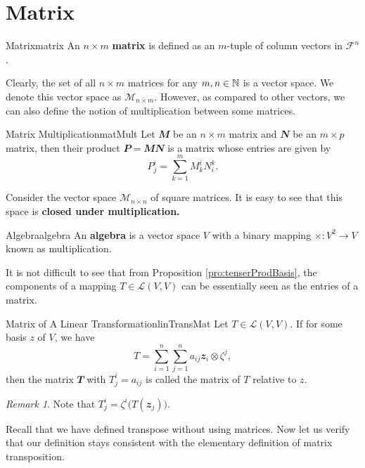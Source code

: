 \documentclass[math, code]{amznotes}
\theoremstyle{remark}
\newtheorem*{remark}{Remark}
\begin{document}
\section{Matrix}
\begin{dfnbox}{Matrix}{matrix}
    An $n \times m$ {\color{red} \textbf{matrix}} is defined as an $m$-tuple of column vectors in $\mathcal{F}^n$.
\end{dfnbox}
Clearly, the set of all $n \times m$ matrices for any $m, n \in \mathbb{N}$ is a vector space. We denote this vector space as $\mathcal{M}_{n \times m}$. However, as compared to other vectors, we can also define the notion of multiplication between some matrices.
\begin{dfnbox}{Matrix Multiplication}{matMult}
    Let $\mathbfit{M}$ be an $n \times m$ matrix and $\mathbfit{N}$ be an $m \times p$ matrix, then their product $\mathbfit{P = MN}$ is a matrix whose entries are given by
    \begin{equation*}
        P^i_j = \sum_{k = 1}^{m}M^i_kN^k_i.
    \end{equation*}
\end{dfnbox}
Consider the vector space $\mathcal{M}_{n \times n}$ of square matrices. It is easy to see that this space is \textbf{closed under multiplication.} 
\begin{dfnbox}{Algebra}{algebra}
    An {\color{red} \textbf{algebra}} is a vector space $V$ with a binary mapping $\times \colon V^2 \to V$ known as multiplication.
\end{dfnbox}
It is not difficult to see that from Proposition \ref{pro:tenserProdBasis}, the components of a mapping $T \in \mathcal{L}(V, V)$ can be essentially seen as the entries of a matrix.
\begin{dfnbox}{Matrix of A Linear Transformation}{linTransMat}
    Let $T \in \mathcal{L}(V, V)$. If for some basis $z$ of $V$, we have
    \begin{equation*}
        T = \sum_{i = 1}^{n}\sum_{j = 1}^{n}a_{ij}\mathbfit{z}_i \otimes \zeta^j,
    \end{equation*}
    then the matrix $\mathbfit{T}$ with $T^i_j = a_{ij}$ is called the matrix of $T$ relative to $z$.
\end{dfnbox}
\begin{notebox}
    \begin{remark}
        Note that $T^i_j = \zeta^i\bigl(T(\mathbfit{z}_j)\bigr)$.
    \end{remark}
\end{notebox}
Recall that we have defined transpose without using matrices. Now let us verify that our definition stays consistent with the elementary definition of matrix transposition.
\end{document}
